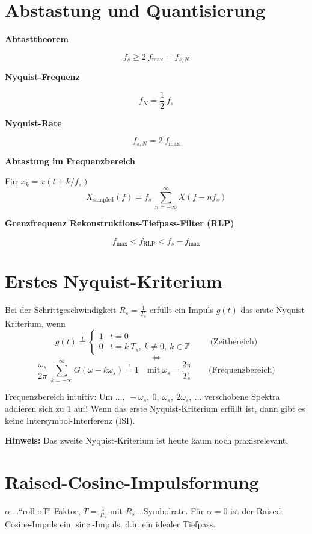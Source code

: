\documentclass[a4paper, 11pt]{article}
\newcommand{\fancyformula}[2]{
        \small
        \raggedright{\sffamily\textbf{#1}}
        #2
}
\DeclareMathOperator{\sinc}{sinc}
\begin{document}
\section*{Abstastung und Quantisierung}
\begin{multicols}{2}
	\fancyformula{Abtasttheorem}{
		\[
			f_s \geq 2 ~ f_{\mathrm{max}} = f_{s, N}
		\]
	}

	\fancyformula{Nyquist-Frequenz}{
		\[
			f_N = \frac{1}{2} ~ f_s
		\]
	}

	\fancyformula{Nyquist-Rate}{
		\[
			f_{s, N} = 2 ~ f_{\mathrm{max}}
		\]
	}

	\fancyformula{Abtastung im Frequenzbereich}{
		Für $x_k = x(t + k / f_s)$
		\[
			X_\mathrm{sampled}(f) = f_s ~ \sum_{n = -\infty}^\infty X(f - n f_s)
		\]
	}

	\fancyformula{Grenzfrequenz Rekonstruktions-Tiefpass-Filter (RLP)}{
		\[
			f_\mathrm{max} < f_\mathrm{RLP} < f_s - f_\mathrm{max}
		\]
	}
\end{multicols}

\section*{Erstes Nyquist-Kriterium}
Bei der Schrittgeschwindigkeit $R_s = \frac{1}{T_s}$ erfüllt ein Impuls $g(t)$ das erste Nyquist-Kriterium, wenn
\[
	g(t) \overset{!}{=} \begin{cases}
		1 & t = 0\\
		0 & t = k ~ T_s, ~ k \neq 0, ~ k \in \mathbb Z
	\end{cases} \qquad \text{(Zeitbereich)}
\]
\[
	\Leftrightarrow
\]
\[
	\frac{\omega_s}{2 \pi} ~ \sum_{k = -\infty}^\infty G(\omega - k \omega_s) \overset{!}{=} 1 \quad \text{mit} ~ \omega_s = \frac{2 \pi}{T_s} \qquad \text{(Frequenzbereich)}
\]

Frequenzbereich intuitiv: Um $\ldots, ~ -\omega_s, ~ 0, ~ \omega_s, ~ 2 \omega_s, ~ \ldots$ verschobene Spektra addieren sich zu $1$ auf!
Wenn das erste Nyquist-Kriterium erfüllt ist, dann gibt es keine Intersymbol-Interferenz (ISI).

\textbf{Hinweis:} Das zweite Nyquist-Kriterium ist heute kaum noch praxisrelevant.

\section*{Raised-Cosine-Impulsformung}
$\alpha$ \ldots ``roll-off''-Faktor, $T = \frac{1}{R_s}$ mit $R_s$ \ldots Symbolrate. Für $\alpha = 0$ ist der Raised-Cosine-Impuls ein $\sinc$-Impuls, d.h. ein idealer Tiefpass.
\end{document}
